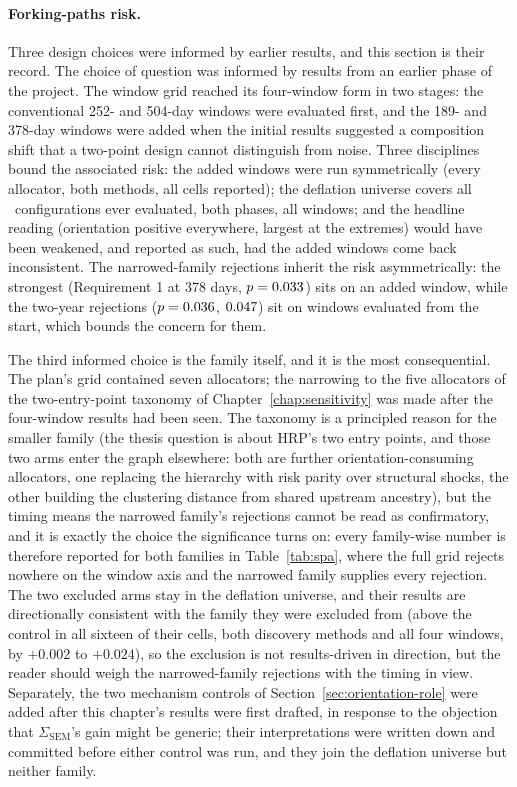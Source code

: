 \paragraph{Forking-paths risk.} Three design choices were informed by
earlier results, and this section is their record. The choice of question
was informed by results from an earlier phase of the project. The window grid reached its
four-window form in two stages: the conventional 252- and 504-day windows
were evaluated first, and the 189- and 378-day windows were added when the
initial results suggested a composition shift that a two-point design
cannot distinguish from noise. Three disciplines bound the associated
risk: the added windows were run symmetrically (every allocator, both
methods, all cells reported); the deflation universe covers all
\rsNtrials\ configurations ever evaluated, both phases, all windows; and
the headline reading (orientation positive everywhere, largest at the
extremes) would have been weakened, and reported as such, had the added
windows come back inconsistent. The narrowed-family rejections inherit
the risk asymmetrically: the strongest (Requirement 1 at 378 days,
$p=0.033$)
sits on an added window, while the two-year rejections
($p=0.036$, $0.047$) sit on windows evaluated from the
start, which bounds the concern for them.

The third informed choice is the family itself, and it is the most
consequential. The plan's grid contained seven allocators; the
narrowing to the five
allocators of the two-entry-point taxonomy of
Chapter~\ref{chap:sensitivity} was made after the four-window results
had been seen. The taxonomy is a principled reason for the smaller
family (the thesis question is about HRP's two entry points, and those
two arms enter the graph elsewhere: both are further
orientation-consuming allocators, one replacing the hierarchy with risk
parity over structural shocks, the other building the clustering
distance from shared upstream ancestry), but the timing means the narrowed
family's rejections cannot be read as
confirmatory, and it is exactly the choice
the significance turns on: every family-wise number is therefore
reported for both families in Table~\ref{tab:spa}, where the full grid
rejects nowhere on the window axis and the narrowed family supplies
every rejection. The two excluded arms stay in the deflation universe,
and their results are directionally consistent with the family they were
excluded from (above the control in all sixteen of their cells, both
discovery methods and all four windows, by $+0.002$ to $+0.024$), so
the exclusion is not results-driven in
direction, but the reader should weigh the narrowed-family rejections
with the timing in view. Separately, the two mechanism controls of
Section~\ref{sec:orientation-role} were added after this chapter's
results were first drafted, in response to the objection that
$\Sigma_{\mathrm{SEM}}$'s gain might be generic; their interpretations
were written down and committed before either control was run, and they
join the deflation universe but neither family.

